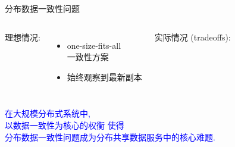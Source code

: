 \begin{frame}{分布数据一致性问题}
  \begin{columns}[t]
	  理想情况:
	  \begin{itemize}
		\item one-size-fits-all\\一致性方案
		\item 始终观察到最新副本
	  \end{itemize}
    \pause
	实际情况 (tradeoffs):
  \end{columns}
  \pause
  \vspace{0.50cm}
  \begin{center}
	\textcolor{blue}{在大规模分布式系统中, \\以数据一致性为核心的权衡  使得 \\
  		分布数据一致性问题成为分布共享数据服务中的核心难题.}
  \end{center}
\end{frame}
%       
